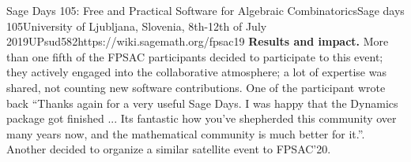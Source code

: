 \begin{event}{Sage Days 105: Free and Practical Software for Algebraic Combinatorics}{Sage days 105}{University of Ljubljana, Slovenia,
8th-12th of July 2019}{UPsud}{58}{2}{https://wiki.sagemath.org/fpsac19}
\textbf{Results and impact.} More than one fifth of the FPSAC
participants decided to participate to this event; they actively
engaged into the collaborative atmosphere; a lot of expertise was
shared, not counting new software contributions. One of the
participant wrote back ``Thanks again for a very useful Sage Days. I
was happy that the Dynamics package got finished ... Its fantastic how
you’ve shepherded this community over many years now, and the
mathematical community is much better for it.''. Another decided to
organize a similar satellite event to FPSAC'20.

\end{event}
